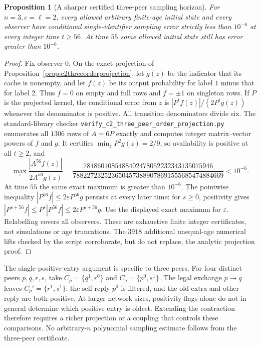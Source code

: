\documentclass[11pt]{article}
\newtheorem{proposition}[theorem]{Proposition}
\begin{document}
\begin{proposition}[A sharper certified three-peer sampling horizon]
\label{prop:c2three56sample}
For $n=3,c=\ell=2$, every allowed arbitrary finite-age initial
state and every observer have conditional single-identifier
sampling error strictly less than $10^{-6}$ at every integer
time $t\ge56$. At time $55$ some allowed initial state still
has error greater than $10^{-6}$.
\end{proposition}
\begin{proof}
Fix observer $0$. On the exact projection of
Proposition~\ref{prop:c2threeorderprojection}, let $g(z)$
be the indicator that its cache is nonempty, and let $f(z)$
be its output probability for label $1$ minus that for label
$2$. Thus $f=0$ on empty and full rows and $f=\pm1$ on
singleton rows. If $P$ is the projected kernel, the conditional
error from $z$ is $|P^tf(z)|/(2P^tg(z))$ whenever the denominator
is positive. All transition denominators divide six.
The standard-library checker
\texttt{verify\_c2\_three\_peer\_order\_projection.py}
enumerates all $1306$ rows of $A=6P$ exactly and computes
integer matrix--vector powers of $f$ and $g$. It certifies
$\min_z P^2g(z)=2/9$, so availability is positive at all
$t\ge2$, and
\[
 \max_z\frac{|A^{56}f(z)|}{2A^{56}g(z)}
 =\frac{7848601085488402478052232343135075946}
 {7882272325236504573889078691555685474884669}
 <10^{-6}.
\]
At time $55$ the same exact maximum is greater than $10^{-6}$.
The pointwise inequality $|P^{56}f|\le2\varepsilon P^{56}g$
persists at every later time: for $s\ge0$, positivity gives
$|P^{s+56}f|\le P^s|P^{56}f|\le2\varepsilon P^{s+56}g$.
Use the displayed exact maximum for $\varepsilon$.
Relabelling covers all observers. These are exhaustive
finite integer certificates, not simulations or age truncations.
The $3918$ additional unequal-age numerical lifts checked by the
script corroborate, but do not replace, the analytic projection proof.
\end{proof}

The single-positive-entry argument is specific to three peers.
For four distinct peers $p,q,r,s$, take
$C_p=\{q^1,r^0\}$ and $C_q=\{p^0,s^1\}$.
The legal exchange $p\to q$ leaves
$C_p'=\{r^1,s^1\}$: the self reply $p^0$ is filtered,
and the old extra and other reply are both positive.
At larger network sizes, positivity flags alone do not in
general determine which positive entry is oldest.
Extending the contraction therefore requires a richer
projection or a coupling that controls these comparisons.
No arbitrary-$n$ polynomial sampling estimate follows
from the three-peer certificate.
\end{document}
